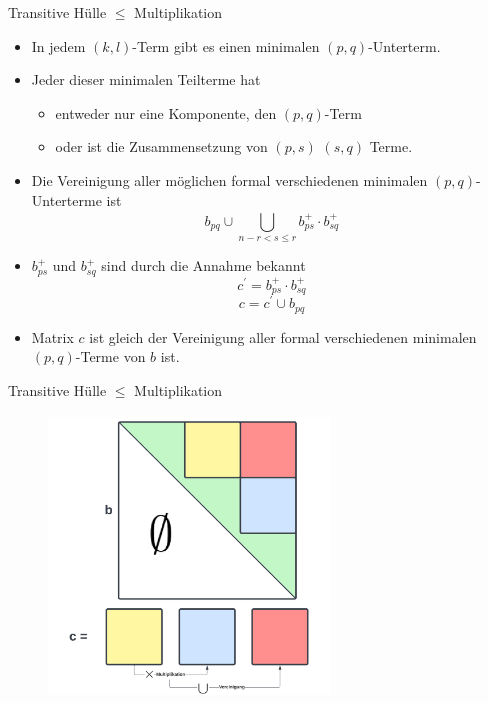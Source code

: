 \documentclass{beamer}
\begin{document}
	\begin{frame}{Transitive Hülle $\le$ Multiplikation}
		\begin{itemize}
			\item In jedem $(k, l)$-Term gibt es einen minimalen $(p, q)$-Unterterm. 
			\item Jeder dieser minimalen Teilterme hat
			\begin{itemize}
				\item entweder nur eine Komponente, den $(p,q)$-Term
				\item oder ist die Zusammensetzung von $(p, s)$ $(s, q)$ Terme.
			\end{itemize}
			\pause
			\item Die Vereinigung aller möglichen formal verschiedenen minimalen $(p,q)$-Unterterme ist
			$$b_{pq} \cup \bigcup_{n-r < s \le r}^{} b_{ps}^+ \cdot b_{sq}^+$$
			\pause
			\item $b_{ps}^+$ und $ b_{sq}^+$ sind durch die Annahme bekannt
			$$c^{'} = b_{ps}^+ \cdot b_{sq}^+$$
			$$c = c^{'} \cup b_{pq}$$
			\item Matrix $c$ ist gleich der Vereinigung aller formal verschiedenen minimalen $(p, q)$-Terme von $b$ ist.
		\end{itemize}
	\end{frame}

	\begin{frame}{Transitive Hülle $\le$ Multiplikation}
		\begin{figure}
			\centering
			\includegraphics[width=7.5cm,height=7.5cm]{img/LGV2}
		\end{figure}
	\end{frame}
\end{document}
